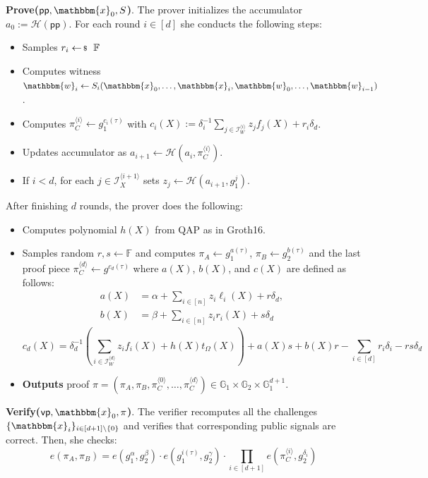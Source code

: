 \textbf{Prove($\mathsf{pp},\mathbbm{x}_0,S$)}. The prover initializes the accumulator $a_0 := \mathcal{H}(\mathsf{pp})$. For each round $i \in [d]$ she conducts the following steps:
\begin{itemize}
    \item Samples $r_i \leftarrowS \mathbb{F}$
    \item Computes witness $\mathbbm{w}_i \gets S_i(\mathbbm{x}_0,\dots,\mathbbm{x}_i,\mathbbm{w}_0,\dots,\mathbbm{w}_{i-1})$.
    \item Computes $\pi_C^{\langle i \rangle} \gets g_1^{c_i(\tau)}$ with $c_i(X) := \delta_i^{-1}\sum_{j \in \mathcal{I}_W^{\langle i \rangle}}z_jf_j(X) + r_i\delta_d$.
    \item Updates accumulator as $a_{i+1} \gets \mathcal{H}(a_i,\pi_C^{\langle i \rangle})$.
    \item If $i<d$, for each $j \in \mathcal{I}_X^{\langle i+1 \rangle}$ sets $z_j \gets \mathcal{H}(a_{i+1},g_1^j)$.
\end{itemize}
After finishing $d$ rounds, the prover does the following:
\begin{itemize}
    \item Computes polynomial $h(X)$ from QAP as in Groth16.
    \item Samples random $r,s \gets \mathbb{F}$ and computes $\pi_A \gets g_1^{a(\tau)}$, $\pi_B \gets g_2^{b(\tau)}$ and the last proof piece $\pi_C^{\langle d \rangle} \gets g^{c_d(\tau)}$ where $a(X)$, $b(X)$, and $c(X)$ are defined as follows:
    \begin{align*}
        a(X) &= \alpha + \sum_{i \in [n]} z_i\ell_i(X) + r\delta_d, \\
        b(X) &= \beta + \sum_{i \in [n]}z_ir_i(X) + s\delta_d
    \end{align*}
    \[
    c_d(X) = \delta_d^{-1}\left(\sum_{i \in \mathcal{I}_W^{\langle d \rangle}}z_if_i(X) + h(X)t_{\Omega}(X)\right) + a(X)s+b(X)r-\sum_{i \in [d]}r_i\delta_i - rs\delta_d
    \]
    \item \textbf{Outputs} proof $\pi=(\pi_A,\pi_B,\pi_C^{\langle 0 \rangle}, \dots, \pi_C^{\langle d \rangle}) \in \mathbb{G}_1 \times \mathbb{G}_2 \times \mathbb{G}_1^{d+1}$.
\end{itemize}

\textbf{Verify($\mathsf{vp},\mathbbm{x}_0,\pi$)}. The verifier recomputes all the challenges $\{\mathbbm{x}_i\}_{i \in [d+1] \setminus \{0\}}$ and verifies that corresponding public signals are correct. Then, she checks:
\[
e(\pi_A,\pi_B) = e(g_1^{\alpha},g_2^{\beta}) \cdot e(g_1^{i(\tau)},g_2^{\gamma}) \cdot \prod_{i \in [d+1]}e(\pi_C^{\langle i \rangle}, g_2^{\delta_i})
\]


